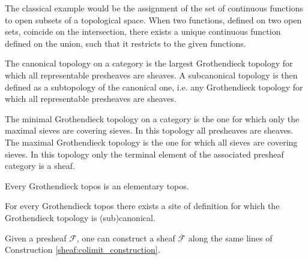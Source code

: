 \begin{example}
        The classical example would be the assignment of the set of continuous functions to open subsets of a topological space. When two functions, defined on two open sets, coincide on the intersection, there exists a unique continuous function defined on the union, such that it restricts to the given functions.
    \end{example}

    \begin{example}
        The canonical topology on a category is the largest Grothendieck topology for which all representable presheaves are sheaves. A subcanonical topology is then defined as a subtopology of the canonical one, i.e. any Grothendieck topology for which all representable presheaves are sheaves.
    \end{example}
    \begin{example}
        The minimal Grothendieck topology on a category is the one for which only the maximal sieves are covering sieves. In this topology all presheaves are sheaves. The maximal Grothendieck topology is the one for which all sieves are covering sieves. In this topology only the terminal element of the associated presheaf category is a sheaf.
    \end{example}

    \begin{property}
        Every Grothendieck topos is an elementary topos.
    \end{property}

    \begin{property}
        For every Grothendieck topos there exists a site of definition for which the Grothendieck topology is (sub)canonical.
    \end{property}

    \begin{construct}[Sheafification]
        Given a presheaf $\mathcal{F}$, one can construct a sheaf $\overline{\mathcal{F}}$ along the same lines of Construction \ref{sheaf:colimit_construction}.
    \end{construct}

